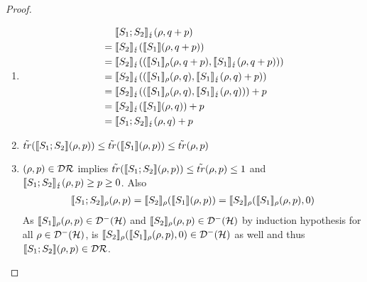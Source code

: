 \documentclass[a4paper,UKenglish,cleveref, autoref, thm-restate]{lipics-v2021}
\begin{document}
\begin{proof}
\begin{itemize}
\begin{enumerate}
            \item
            \begin{align*}
                &\phantom{=.}\llbracket S_1;S_2 \rrbracket_{\lightning}(\rho,q+p) \\
                &= \llbracket S_2 \rrbracket_{\lightning}(\llbracket S_1 \rrbracket(\rho,q+p)) \\
                &= \llbracket S_2 \rrbracket_{\lightning}((\llbracket S_1 \rrbracket_{\rho}(\rho,q+p), \llbracket S_1 \rrbracket_{\lightning}(\rho,q+p)))\\
                &= \llbracket S_2 \rrbracket_{\lightning}((\llbracket S_1 \rrbracket_{\rho}(\rho,q), \llbracket S_1 \rrbracket_{\lightning}(\rho,q)+p)) \\
                &= \llbracket S_2 \rrbracket_{\lightning}((\llbracket S_1 \rrbracket_{\rho}(\rho,q), \llbracket S_1 \rrbracket_{\lightning}(\rho,q))) +p \\
                &= \llbracket S_2 \rrbracket_{\lightning}(\llbracket S_1 \rrbracket(\rho,q))+p\\
                &= \llbracket S_1;S_2 \rrbracket_{\lightning}(\rho,q) + p
            \end{align*}

            \item $\tilde{tr}(\llbracket S_1;S_2 \rrbracket(\rho,p)) \leq  \tilde{tr}(\llbracket S_1 \rrbracket(\rho,p)) \leq \tilde{tr}(\rho,p)$

            \item $(\rho,p) \in \mathcal{D}\mathcal{R}$ implies $\tilde{tr}(\llbracket S_1;S_2 \rrbracket(\rho,p))\leq \tilde{tr}(\rho,p)\leq 1$ and $ \llbracket S_1;S_2 \rrbracket_{\lightning}(\rho,p)\geq p \geq 0$.
            Also
            \begin{align*}
                \llbracket S_1;S_2 \rrbracket_{\rho}(\rho,p) = \llbracket S_2 \rrbracket_{\rho} (\llbracket S_1 \rrbracket (\rho,p )) = \llbracket S_2 \rrbracket_{\rho} (\llbracket S_1 \rrbracket_{\rho} (\rho,p ),0)
            \end{align*}
            As $\llbracket S_1 \rrbracket_{\rho} (\rho,p ) \in \mathcal{D}^- (\mathcal{H})$ and $\llbracket S_2 \rrbracket_{\rho}(\rho,p) \in \mathcal{D}^- (\mathcal{H})$ by induction hypothesis for all $\rho \in \mathcal{D}^- (\mathcal{H})$, is  $\llbracket S_2 \rrbracket_{\rho} (\llbracket S_1 \rrbracket_{\rho} (\rho,p ),0) \in \mathcal{D}^- (\mathcal{H})$ as well and thus $\llbracket S_1;S_2 \rrbracket(\rho,p) \in \mathcal{D}\mathcal{R}$.


\end{enumerate}
\end{itemize}
\end{proof}
\end{document}
